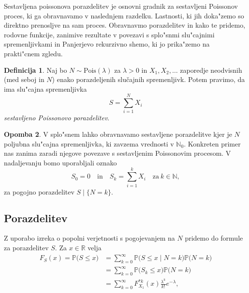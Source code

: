 \documentclass[12pt, a4paper, reqno]{amsart}
\theoremstyle{definition}
\newtheorem{definicija}{Definicija}[section]
\newtheorem{opomba}[definicija]{Opomba}
\theoremstyle{plain}
\newcommand{\R}{\mathbb{R}}
\newcommand{\N}{\mathbb{N}}
\newcommand{\Prob}{\mathbb{P}}
\newcommand{\1}{\mathds{1}}
\newcommand{\Pois}[1]{\text{Pois}(#1)}
\begin{document}
    Sestavljena poissonova porazdelitev je osnovni gradnik za sestavljeni Poissonov proces, ki ga obravnavamo 
    v naslednjem razdelku. Lastnosti, ki jih doka"zemo so direktno prenosljve na sam proces. Obravnavmo 
    porazdelitev in kako te pridemo, rodovne funkcije, zanimive rezultate v povezavi s 
    splo"snmi slu"cajnimi spremenljivkami in Panjerjevo rekurzivno shemo, ki jo prika"zemo na 
    prakti"cnem zgledu.

    \begin{definicija}
        Naj bo $N\sim \Pois{\lambda}$  za $\lambda >0$ in $X_1, X_2, \dots$ zaporedje neodvisnih (med seboj in $N$)
        enako porazdeljenih slučajnih spremenljivk. Potem pravimo, da ima slu"cajna spremenljivka
        \begin{equation*}
            S = \sum_{i=1}^NX_i
        \end{equation*}
        \textit{sestavljeno Poissonovo porazdelitev}. 
        \label{def:sestavljenaPoissonovaPorazdelitev}
    \end{definicija}

    \begin{opomba}
        V splo"snem lahko obravnavamo sestavljene porazdelitve kjer je $N$ poljubna slu"cajna spremenljivka,
        ki zavzema vrednosti v $\N_0$. Konkreten primer nas zanima zaradi njegove povezave s sestavljenim
        Poissonovim procesom. V nadaljevanju bomo uporabljali oznako
        \begin{equation*}
            S_0 = 0 \quad \text{in} \quad S_k = \sum_{i=1}^kX_i \quad \text{za} \ k\in\N, 
        \end{equation*}
        za pogojno porazdelitev $S\mid\{N = k\}$.
        \label{op:gneralCaseCOmpound}
    \end{opomba}

    \subsection{Porazdelitev}
    Z uporabo izreka o popolni verjetnosti s pogojevanjem na $N$ pridemo do formule za 
    porazdelitev $S$. Za $x \in \R$ velja 
    \begin{align*}
        F_{S}(x) = \Prob\bigl(S \leq x\bigr) 
        &= \sum_{k=0}^\infty \Prob\bigl(S \leq x \mid N = k\bigr)\Prob\bigl(N = k\bigr) \\
        &= \sum_{k=0}^\infty \Prob\bigl(S_k \leq x\bigr)\Prob\bigl(N = k\bigr) \\
        &= \sum_{k=0}^\infty F_{X_1}^{*k}(x) \frac{\lambda^k}{k!} e^{-\lambda},
    \end{align*}
\end{document}
